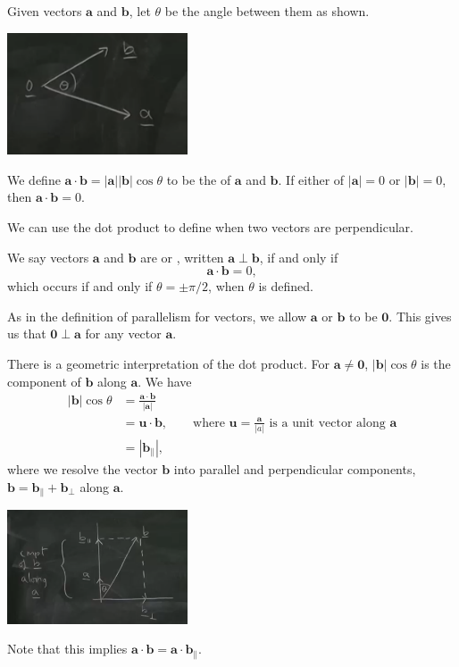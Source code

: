 \documentclass[a4]{scrreprt}
\begin{document}
\begin{definition}
	Given vectors $\mathbf{a}$ and $\mathbf{b}$, let $\theta$ be the angle between them as shown.
	\begin{center}
		\includegraphics[width=0.4\textwidth]{angle.png}
	\end{center}
	We define $\mathbf{a} \cdot \mathbf{b} = |\mathbf{a}| |\mathbf{b}| \cos \theta$ to be the  of $\mathbf{a}$ and $\mathbf{b}$.  If either of $|\mathbf{a}| = 0$ or $|\mathbf{b}| = 0$, then $\mathbf{a} \cdot \mathbf{b} = 0$.
\end{definition}

We can use the dot product to define when two vectors are perpendicular.

\begin{definition}[Perpendicularity]
	We say vectors $\mathbf{a}$ and $\mathbf{b}$ are  or , written $\mathbf{a} \perp \mathbf{b}$, if and only if
	$$
	\mathbf{a} \cdot \mathbf{b} = 0,
	$$
	which occurs if and only if $\theta = \pm \pi/2$, when $\theta$ is defined.
\end{definition}
As in the definition of parallelism for vectors, we allow $\mathbf{a}$ or $\mathbf{b}$ to be $\mathbf{0}$. This gives us that $\mathbf{0} \perp \mathbf{a}$ for any vector $\mathbf{a}$.


There is a geometric interpretation of the dot product. For $\mathbf{a}\neq \mathbf{0}$, $|\mathbf{b} | \cos \theta$ is the component of $\mathbf{b}$ along $\mathbf{a}$. We have
\begin{align*}
	|\mathbf{b}| \cos \theta &= \frac{\mathbf{a} \cdot \mathbf{b}}{|\mathbf{a}|} \\
	&= \mathbf{u} \cdot \mathbf{b}, \quad \quad \text{where } \mathbf{u} = \frac{\mathbf{a}}{|a|} \text{ is a unit vector along } \mathbf{a} \\
	&= | \mathbf{b}_{\parallel} |,
\end{align*}
where we resolve the vector $\mathbf{b}$ into parallel and perpendicular components, $\mathbf{b} = \mathbf{b}_{\parallel} + \mathbf{b}_{\perp}$ along $\mathbf{a}$.
\begin{center}
	\includegraphics[width=0.4\textwidth]{resolve.png}
\end{center}
Note that this implies $\mathbf{a} \cdot \mathbf{b} = \mathbf{a} \cdot \mathbf{b}_{\parallel}$.
\end{document}
